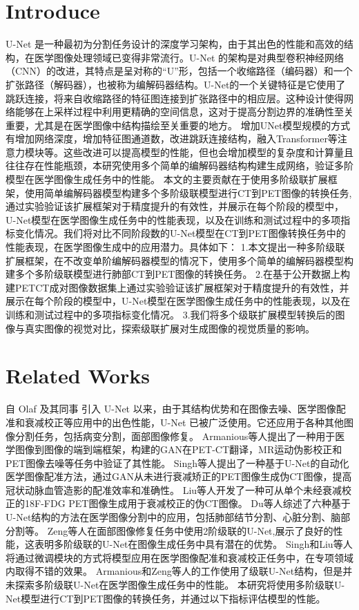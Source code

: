 \documentclass[twocolumn]{article}
\begin{document}
\section{Introduce}
U-Net 是一种最初为分割任务设计的深度学习架构，由于其出色的性能和高效的结构，在医学图像处理领域已变得非常流行。U-Net 的架构是对典型卷积神经网络（CNN）的改进，其特点是呈对称的“U”形，包括一个收缩路径（编码器）和一个扩张路径（解码器），也被称为编解码器结构。U-Net的一个关键特征是它使用了跳跃连接，将来自收缩路径的特征图连接到扩张路径中的相应层。这种设计使得网络能够在上采样过程中利用更精确的空间信息，这对于提高分割边界的准确性至关重要，尤其是在医学图像中结构描绘至关重要的地方。
增加UNet模型规模的方式有增加网络深度，增加特征图通道数，改进跳跃连接结构，融入Transformer等注意力模块等。这些改进可以提高模型的性能，但也会增加模型的复杂度和计算量且往往存在性能瓶颈，本研究使用多个简单的编解码器结构构建生成网络，验证多阶模型在医学图像生成任务中的性能。
本文的主要贡献在于使用多阶级联扩展框架，使用简单编解码器模型构建多个多阶级联模型进行CT到PET图像的转换任务,通过实验验证该扩展框架对于精度提升的有效性，并展示在每个阶段的模型中，U-Net模型在医学图像生成任务中的性能表现，以及在训练和测试过程中的多项指标变化情况。我们将对比不同阶段数的U-Net模型在CT到PET图像转换任务中的性能表现，在医学图像生成中的应用潜力。具体如下：
1.本文提出一种多阶级联扩展框架，在不改变单阶编解码器模型的情况下，使用多个简单的编解码器模型构建多个多阶级联模型进行肺部CT到PET图像的转换任务。
2.在基于公开数据上构建PETCT成对图像数据集上通过实验验证该扩展框架对于精度提升的有效性，并展示在每个阶段的模型中，U-Net模型在医学图像生成任务中的性能表现，以及在训练和测试过程中的多项指标变化情况。
3.我们将多个级联扩展模型转换后的图像与真实图像的视觉对比，探索级联扩展对生成图像的视觉质量的影响。

\section{Related Works}
自 Olaf 及其同事 \cite{navab_u-net_2015} 引入 U-Net 以来，由于其结构优势和在图像去噪、医学图像配准和衰减校正等应用中的出色性能，U-Net 已被广泛使用。它还应用于各种其他图像分割任务，包括病变分割，面部图像修复。
Armanious等人\cite{armanious_medgan_2020}提出了一种用于医学图像到图像的端到端框架，构建的GAN在PET-CT翻译，MR运动伪影校正和PET图像去噪等任务中验证了其性能。
Singh等人\cite{singh_automated_2023}提出了一种基于U-Net的自动化医学图像配准方法，通过GAN从未进行衰减矫正的PET图像生成伪CT图像，提高冠状动脉血管造影的配准效率和准确性。
Liu等人\cite{liu_deep_2018}开发了一种可从单个未经衰减校正的18F-FDG PET图像生成用于衰减校正的伪CT图像。
Du等人\cite{du_medical_2020}综述了六种基于U-Net结构的方法在医学图像分割中的应用，包括肺部结节分割、心脏分割、脑部分割等。
Zeng等人\cite{zeng_swin-casunet_2022}在面部图像修复任务中使用2阶级联的U-Net,展示了良好的性能，这表明多阶级联的U-Net在图像生成任务中具有潜在的优势。
Singh和Liu等人将通过微调模块的方式将模型应用在医学图像配准和衰减校正任务中，在专项领域内取得不错的效果。
Armanious和Zeng等人的工作使用了级联U-Net结构，但是并未探索多阶级联U-Net在医学图像生成任务中的性能。
本研究将使用多阶级联U-Net模型进行CT到PET图像的转换任务，并通过以下指标评估模型的性能。
\end{document}
